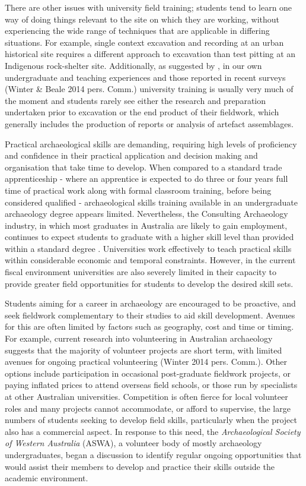 \documentclass{ijsra}
\begin{document}
There are other issues with university field training; students tend to learn one way of doing things relevant to the site on which they are working, without experiencing the wide range of techniques that are applicable in differing situations. 
For example, single context excavation and recording at an urban historical site requires a different approach to excavation than test pitting at an Indigenous rock-shelter site. 
Additionally, as suggested by \textcite[44]{cosgrove2013}, in our own undergraduate and teaching experiences and 
those reported in recent surveys (Winter \& Beale 2014 pers. Comm.) university training is usually very much of the moment and students rarely see either the research and preparation undertaken prior to excavation or the end product of their fieldwork, which generally includes the production of reports or analysis of artefact assemblages.

Practical archaeological skills are demanding, requiring high levels of proficiency and confidence in their practical application and decision making and organisation that take time to develop. 
When compared to a standard trade apprenticeship - where an apprentice is expected to do three or four years full time of practical work along with formal classroom training, before being considered qualified - archaeological skills training available in an undergraduate archaeology degree appears limited. 
Nevertheless, the Consulting Archaeology industry, in which most graduates in Australia are likely to gain employment, continues to expect students to graduate with a higher skill level than provided within a standard degree \parencites{colley2004}{colley2012}{gibbs2005}. 
Universities work effectively to teach practical skills within considerable economic and temporal constraints. However, in the current fiscal environment universities are also severely limited in their capacity to provide greater field opportunities for students to develop the desired skill sets.

Students aiming for a career in archaeology are encouraged to be proactive, and seek fieldwork complementary to their studies to aid skill development. 
Avenues for this are often limited by factors such as geography, cost and time or timing. 
For example, current research into volunteering in Australian archaeology suggests that the majority of volunteer projects are short term, with limited avenues for ongoing practical volunteering (Winter 2014 pers. Comm.). 
Other options include participation in occasional post-graduate fieldwork projects, or paying inflated prices to attend overseas field schools, or those run by specialists at other Australian universities. 
Competition is often fierce for local volunteer roles and many projects cannot accommodate, or afford to supervise, the large numbers of students seeking to develop field skills, particularly when the project also has a commercial aspect. 
In response to this need, the \emph{Archaeological Society of Western Australia} (ASWA), a volunteer body of mostly archaeology undergraduates, began a discussion to identify regular ongoing opportunities that would assist their members to develop and practice their skills outside the academic environment. 
\end{document}
